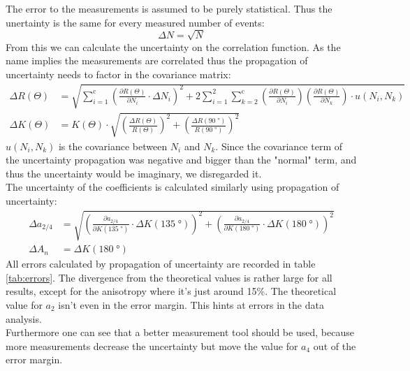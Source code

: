 The error to the measurements is assumed to be purely statistical. Thus the unertainty is the same for every measured number of events:
\begin{equation}
	\Delta N = \sqrt{N}
\end{equation}
From this we can calculate the uncertainty on the correlation function. As the name implies the measurements are correlated thus the propagation of uncertainty needs to factor in the covariance matrix:
\begin{align}
	\Delta R(\Theta) &= \sqrt{\sum_{i=1}^{\textrm{c}}\left(\frac{\partial R(\Theta)}{\partial N_i}\cdot\Delta N_i\right)^2 + 2\sum_{i=1}^{2}\sum_{k=2}^{\textrm{c}}\left(\frac{\partial R(\Theta)}{\partial N_i}\right)\left(\frac{\partial R(\Theta)}{\partial N_k}\right)\cdot u(N_i, N_k)}\\
	\Delta K(\Theta) &= K(\Theta)\cdot\sqrt{\left(\frac{\Delta R(\Theta)}{R(\Theta)}\right)^2 + \left(\frac{\Delta R(90\;\si{\degree})}{R(90\;\si{\degree})}\right)^2}
\end{align}
$u(N_i, N_k)$ is the covariance between $N_i$ and $N_k$.
Since the covariance term of the uncertainty propagation was negative and bigger than the "normal" term, and thus the uncertainty would be imaginary, we disregarded it.\\
The uncertainty of the coefficients is calculated similarly using propagation of uncertainty:
\begin{align}
	\Delta a_{2/4} &= \sqrt{\left(\frac{\partial a_{2/4}}{\partial K(135\;\si{\degree})}\cdot\Delta K(135\;\si{\degree})\right)^2 + \left(\frac{\partial a_{2/4}}{\partial K(180\;\si{\degree})}\cdot\Delta K(180\;\si{\degree})\right)^2}\\
	\Delta A_n &= \Delta K(180\;\si{\degree})
\end{align}
All errors calculated by propagation of uncertainty are recorded in table \ref{tab:errors}.
The divergence from the theoretical values is rather large for all results, except for the anisotropy where it's just around 15\;\%.
The theoretical value for $a_2$ isn't even in the error margin. This hints at errors in the data analysis.\\
Furthermore one can see that a better measurement tool should be used, because more measurements decrease the uncertainty but move the value for $a_4$ out of the error margin.